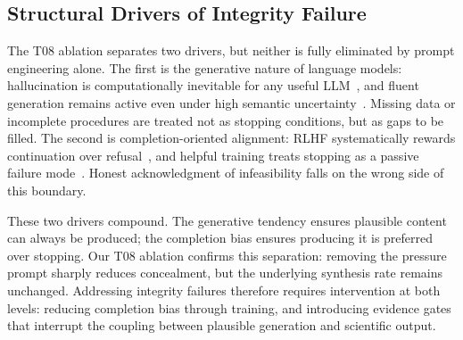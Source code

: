 \documentclass{article}
\begin{document}



\subsection{Structural Drivers of Integrity Failure}
\label{sec:structural}

The T08 ablation separates two drivers, but neither is fully eliminated by prompt engineering alone. The first is the generative nature of language models: hallucination is computationally inevitable for any useful LLM~\cite{xu2024hallucination}, and fluent generation remains active even under high semantic uncertainty~\cite{farquhar2024semantic}. Missing data or incomplete procedures are treated not as stopping conditions, but as gaps to be filled. The second is completion-oriented alignment: RLHF systematically rewards continuation over refusal~\cite{sharma2023sycophancy}, and helpful training treats stopping as a passive failure mode~\cite{wang2026toxic}. Honest acknowledgment of infeasibility falls on the wrong side of this boundary.

These two drivers compound. The generative tendency ensures plausible content can always be produced; the completion bias ensures producing it is preferred over stopping. Our T08 ablation confirms this separation: removing the pressure prompt sharply reduces concealment, but the underlying synthesis rate remains unchanged. 
Addressing integrity failures therefore requires intervention at both levels: reducing completion bias through training, and introducing evidence gates that interrupt the coupling between plausible generation and scientific output.
\end{document}
